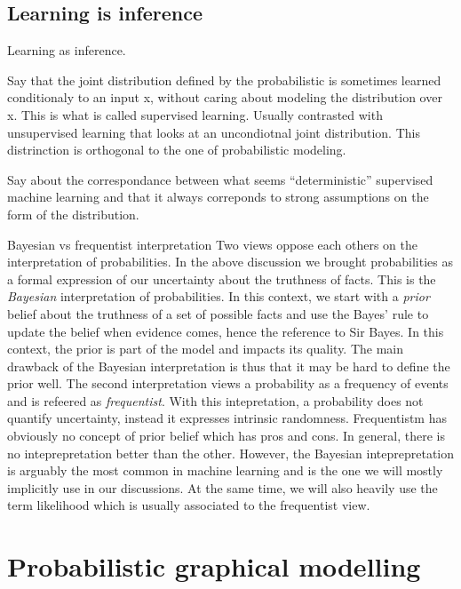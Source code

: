 \subsection{Learning is inference}
Learning as inference.

Say that the joint distribution defined by the probabilistic is sometimes learned conditionaly to an input x, without caring about modeling the distribution over x. This is what is called supervised learning. Usually contrasted with unsupervised learning that looks at an uncondiotnal joint distribution. This distrinction is orthogonal to the one of probabilistic modeling.

Say about the correspondance between what seems ``deterministic'' supervised machine learning and that it always correponds to strong assumptions on the form of the distribution.



\begin{side_note}{Bayesian vs frequentist interpretation}
  Two views oppose each others on the interpretation of probabilities. In the above discussion we brought probabilities as a formal expression of our uncertainty about the truthness of facts. This is the \textit{Bayesian} interpretation of probabilities. In this context, we start with a \textit{prior} belief about the truthness of a set of possible facts and use the Bayes' rule to update the belief when evidence comes, hence the reference to Sir Bayes. In this context, the prior is part of the model and impacts its quality. The main drawback of the Bayesian interpretation is thus that it may be hard to define the prior well. The second interpretation views a probability as a frequency of events and is refeered as \textit{frequentist}. With this intepretation, a probability does not quantify uncertainty, instead it expresses intrinsic randomness. Frequentistm has obviously no concept of prior belief which has pros and cons. In general, there is no inteprepretation better than the other. However, the Bayesian inteprepretation is arguably the most common in machine learning and is the one we will mostly implicitly use in our discussions. At the same time, we will also heavily use the term likelihood which is usually associated to the frequentist view.
\end{side_note}
\section{Probabilistic graphical modelling}

